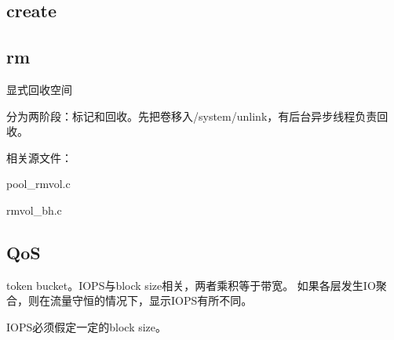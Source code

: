 \subsection{create}

\subsection{rm}

显式回收空间

分为两阶段：标记和回收。先把卷移入/system/unlink，有后台异步线程负责回收。

相关源文件：
\begin{compactitem}
\item pool\_rmvol.c
\item rmvol\_bh.c
\end{compactitem}


\subsection{QoS}

token bucket。IOPS与block size相关，两者乘积等于带宽。
如果各层发生IO聚合，则在流量守恒的情况下，显示IOPS有所不同。

IOPS必须假定一定的block size。
